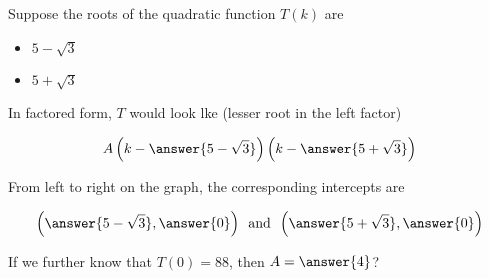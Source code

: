 \documentclass{ximera}
\author{Lee Wayand}
\begin{document}
\begin{exercise} Suppose the roots of the quadratic function $T(k)$ are



\begin{itemize}
\item $5 - \sqrt{3}$
\item $5 + \sqrt{3}$
\end{itemize}


In factored form, $T$ would look lke (lesser root in the left factor)

\[ A \left( k - \answer{5 - \sqrt{3}} \right) \left( k - \answer{5 + \sqrt{3}} \right) \]




From left to right on the graph, the corresponding intercepts are 

\[  
\left( \answer{5 - \sqrt{3}}, \answer{0} \right) \, \text{ and } \, \left( \answer{5 + \sqrt{3}}, \answer{0} \right)
\]


If we further know that $T(0) = 88$, then $A = \answer{4}$?





\end{exercise}
\end{document}
